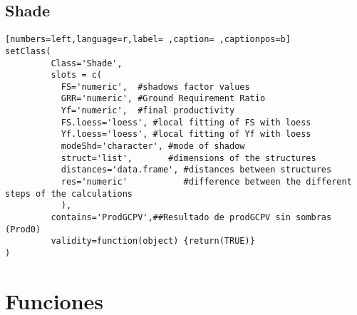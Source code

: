 \subsection{Shade}
\label{sec:orgbe975c4}
\begin{lstlisting}[numbers=left,language=r,label= ,caption= ,captionpos=b]
setClass(
         Class='Shade',
         slots = c(
           FS='numeric',  #shadows factor values
           GRR='numeric', #Ground Requirement Ratio
           Yf='numeric',  #final productivity
           FS.loess='loess', #local fitting of FS with loess
           Yf.loess='loess', #local fitting of Yf with loess
           modeShd='character', #mode of shadow
           struct='list',       #dimensions of the structures
           distances='data.frame', #distances between structures
           res='numeric'           #difference between the different steps of the calculations
           ),
         contains='ProdGCPV',##Resultado de prodGCPV sin sombras (Prod0)
         validity=function(object) {return(TRUE)}
)
\end{lstlisting}
\section{Funciones}
\label{sec:orge099a75}
